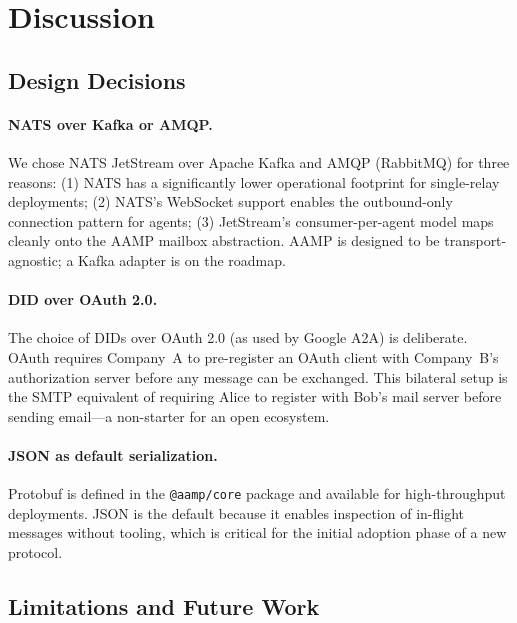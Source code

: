 \documentclass[11pt,a4paper]{article}
\begin{document}
\section{Discussion}
\label{sec:discussion}

\subsection{Design Decisions}

\paragraph{NATS over Kafka or AMQP.}
We chose NATS JetStream over Apache Kafka and AMQP (RabbitMQ) for three reasons:
(1) NATS has a significantly lower operational footprint for single-relay deployments;
(2) NATS's WebSocket support enables the outbound-only connection pattern for agents;
(3) JetStream's consumer-per-agent model maps cleanly onto the AAMP mailbox abstraction.
AAMP is designed to be transport-agnostic; a Kafka adapter is on the roadmap.

\paragraph{DID over OAuth 2.0.}
The choice of DIDs over OAuth 2.0 (as used by Google A2A) is deliberate. OAuth
requires Company~A to pre-register an OAuth client with Company~B's authorization
server before any message can be exchanged. This bilateral setup is the SMTP
equivalent of requiring Alice to register with Bob's mail server before sending
email---a non-starter for an open ecosystem.

\paragraph{JSON as default serialization.}
Protobuf is defined in the \texttt{@aamp/core} package and available for
high-throughput deployments. JSON is the default because it enables inspection
of in-flight messages without tooling, which is critical for the initial adoption
phase of a new protocol.

\subsection{Limitations and Future Work}
\end{document}
